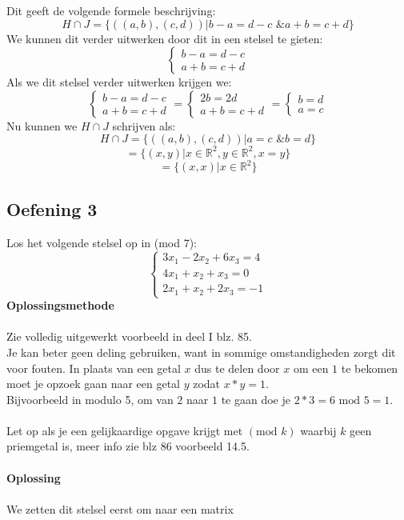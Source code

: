 \documentclass[11pt,a4paper,titlepage]{article}
\begin{document}
Dit geeft de volgende formele beschrijving:
$$ H \cap J = \{((a, b),(c, d))|b-a = d-c \text{ \& } a+b = c+d\}$$
We kunnen dit verder uitwerken door dit in een stelsel te gieten:
$$
\begin{cases}
	b-a = d-c \\
	a+b = c+d
\end{cases}$$
Als we dit stelsel verder uitwerken krijgen we: 
$$
\begin{cases}
	b-a = d-c \\
	a+b = c+d
\end{cases}
=
\begin{cases}
	2b = 2d \\
	a+b = c+d
\end{cases}
=
\begin{cases}
	b = d \\
	a = c
\end{cases}
$$
Nu kunnen we $ H \cap J $ schrijven als:
	$$ H \cap J = \{((a, b),(c, d))| a = c \text{ \& } b = d\}$$
	$$= \{ (x,y) | x \in \mathbb{R}^2 , y \in \mathbb{R}^2 ,x =y \}$$ 
	$$= \{ (x,x) | x \in \mathbb{R}^2 \}$$
\subsection{Oefening 3}
Los het volgende stelsel op in (mod 7):
$$
\begin{cases}
	3x_1 - 2x_2 + 6x_3 = 4\\
	4x_1 + x_2 + x_3 = 0 \\
	2x_1 + x_2 + 2x_3 = -1
\end{cases}$$
\textbf{Oplossingsmethode}\\ \\
Zie volledig uitgewerkt voorbeeld in deel I blz. 85. \\
Je kan beter geen deling gebruiken, want in sommige omstandigheden zorgt dit voor fouten. In plaats van een getal $x$ dus te delen door $x$ om een $1$ te bekomen moet je opzoek gaan naar een getal $y$ zodat $x*y=1$.\\
Bijvoorbeeld in modulo 5, om van $2$ naar $1$ te gaan doe je $2*3 = 6 \text{ mod } 5 = 1$.\\ \\
Let op als je een gelijkaardige opgave krijgt met $(\text{mod } k)$ waarbij $k$ geen priemgetal is, meer info zie blz 86 voorbeeld 14.5. \\ \\
\textbf{Oplossing}\\ \\
We zetten dit stelsel eerst om naar een matrix
\end{document}
